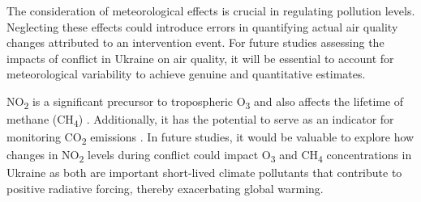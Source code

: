 The consideration of meteorological effects is crucial in regulating pollution levels. Neglecting these effects could introduce errors in quantifying actual air quality changes attributed to an intervention event. For future studies assessing the impacts of conflict in Ukraine on air quality, it will be essential to account for meteorological variability to achieve genuine and quantitative estimates.\par

NO\textsubscript{2} is a significant precursor to tropospheric O\textsubscript{3} and also affects the lifetime of methane (CH\textsubscript{4}) \citep{akimoto2022rethinking}. Additionally, it has the potential to serve as an indicator for monitoring CO\textsubscript{2} emissions \citep{miyazaki2023predictability}. In future studies, it would be valuable to explore how changes in NO\textsubscript{2} levels during conflict could impact O\textsubscript{3} and CH\textsubscript{4} concentrations in Ukraine as both are important short-lived climate pollutants that contribute to positive radiative forcing, thereby exacerbating global warming.\par
